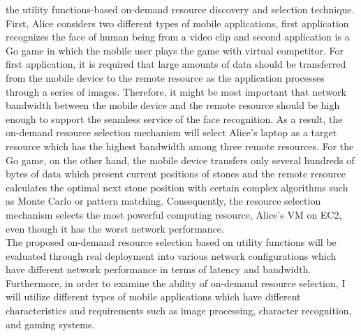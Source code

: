 the utility functions-based on-demand resource discovery and selection
technique.
%
First, Alice considers two different types of mobile applications, first
application recognizes the face of human being from a video clip and
second application is a Go game in which the mobile user plays
the game with virtual competitor.
%
For first application, it is required that large amounts of data should
be transferred from the mobile device to the remote resource as the
application processes through a series of images.
%
Therefore, it might be most important that network bandwidth between the
mobile device and the remote resource should be high enough to support
the seamless service of the face recognition.
%
As a result, the on-demand resource selection mechanism will select
Alice's laptop as a target resource which has the highest bandwidth
among three remote resources.
%
For the Go game, on the other hand, the mobile device transfers only
several hundreds of bytes of data which present current positions of
stones and the remote resource calculates the optimal next stone
position with certain complex algorithms such as Monte Carlo or pattern
matching.
%
Consequently, the resource selection mechanism selects the most powerful
computing resource, Alice's VM on EC2, even though it has the worst
network performance.\\
%
The proposed on-demand resource selection based on utility functions
will be evaluated through real deployment into various network
configurations which have different network performance in terms of
latency and bandwidth.
%
Furthermore, in order to examine the ability of on-demand resource
selection, I will utilize different types of mobile applications which
have different characteristics and requirements such as image
processing, character recognition, and gaming systems.
%

